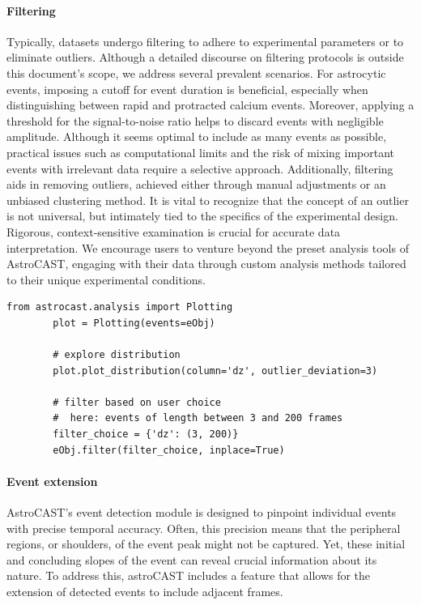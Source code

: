 \documentclass[utf8]{FrontiersinHarvard}
\begin{document}
    \paragraph{Filtering}
    Typically, datasets undergo filtering to adhere to experimental parameters or to eliminate outliers. Although a detailed discourse on filtering protocols is outside this document's scope, we address several prevalent scenarios. For astrocytic events, imposing a cutoff for event duration is beneficial, especially when distinguishing between rapid and protracted calcium events. Moreover, applying a threshold for the signal-to-noise ratio helps to discard events with negligible amplitude. Although it seems optimal to include as many events as possible, practical issues such as computational limits and the risk of mixing important events with irrelevant data require a selective approach. Additionally, filtering aids in removing outliers, achieved either through manual adjustments or an unbiased clustering method. It is vital to recognize that the concept of an outlier is not universal, but intimately tied to the specifics of the experimental design. Rigorous, context-sensitive examination is crucial for accurate data interpretation. We encourage users to venture beyond the preset analysis tools of AstroCAST, engaging with their data through custom analysis methods tailored to their unique experimental conditions.

    \begin{lstlisting}[style=pyStyle]
        from astrocast.analysis import Plotting
        plot = Plotting(events=eObj)

        # explore distribution
        plot.plot_distribution(column='dz', outlier_deviation=3)

        # filter based on user choice
        #  here: events of length between 3 and 200 frames
        filter_choice = {'dz': (3, 200)}
        eObj.filter(filter_choice, inplace=True)
    \end{lstlisting}

    \paragraph{Event extension}
    AstroCAST's event detection module is designed to pinpoint individual events with precise temporal accuracy. Often, this precision means that the peripheral regions, or shoulders, of the event peak might not be captured. Yet, these initial and concluding slopes of the event can reveal crucial information about its nature. To address this, astroCAST includes a feature that allows for the extension of detected events to include adjacent frames.
\end{document}
